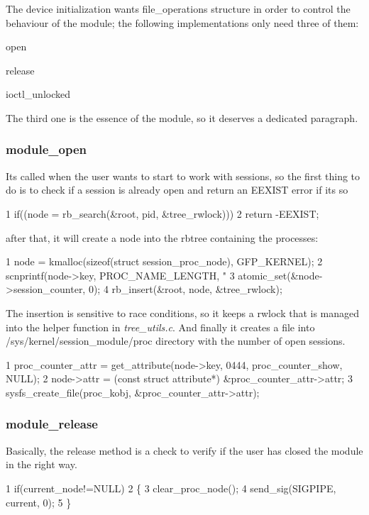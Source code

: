 The device initialization wants file\+\_\+operations structure in order to control the behaviour of the module; the following implementations only need three of them\+:
\begin{DoxyItemize}
\item open
\item release
\item ioctl\+\_\+unlocked
\end{DoxyItemize}

The third one is the essence of the module, so it deserves a dedicated paragraph. \subsubsection*{module\+\_\+open}

It\textquotesingle{}s called when the user wants to start to work with sessions, so the first thing to do is to check if a session is already open and return an E\+E\+X\+I\+ST error if it\textquotesingle{}s so 
\begin{DoxyCode}
1 if((node = rb\_search(&root, pid, &tree\_rwlock)))
2         return -EEXIST;
\end{DoxyCode}


after that, it will create a node into the rbtree containing the processes\+: 
\begin{DoxyCode}
1 node = kmalloc(sizeof(struct session\_proc\_node), GFP\_KERNEL);
2     scnprintf(node->key, PROC\_NAME\_LENGTH, "%
3     atomic\_set(&node->session\_counter, 0);
4     rb\_insert(&root, node, &tree\_rwlock);
\end{DoxyCode}
 The insertion is sensitive to race conditions, so it keeps a rwlock that is managed into the helper function in {\itshape tree\+\_\+utils.\+c}. And finally it creates a file into /sys/kernel/session\+\_\+module/proc directory with the number of open sessions.


\begin{DoxyCode}
1 proc\_counter\_attr = get\_attribute(node->key, 0444, proc\_counter\_show, NULL);
2     node->attr = (const struct attribute*) &proc\_counter\_attr->attr;
3     sysfs\_create\_file(proc\_kobj, &proc\_counter\_attr->attr);
\end{DoxyCode}


\subsubsection*{module\+\_\+release}

Basically, the release method is a check to verify if the user has closed the module in the right way. 
\begin{DoxyCode}
1 if(current\_node!=NULL)
2 \{
3     clear\_proc\_node();                  
4     send\_sig(SIGPIPE, current, 0);
5 \}
\end{DoxyCode}


